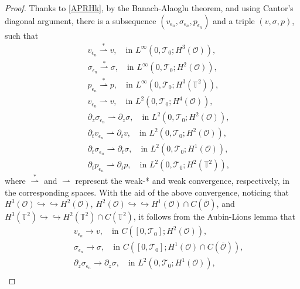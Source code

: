\documentclass[12pt,reqno]{amsart}
\numberwithin{equation}{section}
\begin{document}
\begin{proof}
  Thanks to \eqref{APRHk}, by the Banach-Alaoglu theorem, and using Cantor's diagonal argument,
  there is a subsequence $(v_{\epsilon_n}, \sigma_{\epsilon_n}, p_{\epsilon_n})$ and a triple $(v,\sigma,p)$,
  such that
  \begin{eqnarray}
    &&v_{\epsilon_n}\stackrel{\ast}{\rightharpoonup}v,\quad\mbox{in }L^\infty(0,\mathcal T_0; H^3(\mathcal O)),\label{WeaC1}\\
    &&\sigma_{\epsilon_n}\stackrel{\ast}{\rightharpoonup}\sigma,\quad\mbox{in }L^\infty(0,\mathcal T_0; H^2(\mathcal O)),\label{WeaC2}\\
    &&p_{\epsilon_n}\stackrel{\ast}{\rightharpoonup}p,\quad\mbox{in }L^\infty(0,\mathcal T_0; H^3(\mathbb T^2)),\label{WeaC3}\\
    &&v_{\epsilon_n}{\rightharpoonup}v,\quad\mbox{in }L^2(0,\mathcal T_0; H^4(\mathcal O)),\label{WeaC4}\\
    &&\partial_z\sigma_{\epsilon_n} {\rightharpoonup}\partial_z\sigma,\quad\mbox{in }L^2(0,\mathcal T_0; H^2(\mathcal O)),\label{WeaC5}\\
    &&\partial_tv_{\epsilon_n} {\rightharpoonup}\partial_tv,\quad\mbox{in }L^2(0,\mathcal T_0; H^2(\mathcal O)),\label{WeaC6}\\
    &&\partial_t\sigma_{\epsilon_n} {\rightharpoonup}\partial_t\sigma,\quad\mbox{in }L^2(0,\mathcal T_0; H^1(\mathcal O)),\label{WeaC7}\\
    &&\partial_tp_{\epsilon_n} {\rightharpoonup}\partial_tp,\quad\mbox{in }L^2(0,\mathcal T_0; H^2(\mathbb T^2)),\label{WeaC8}
  \end{eqnarray}
  where $\stackrel{\ast}{\rightharpoonup}$ and $\rightharpoonup$ represent the weak-* and weak convergence, respectively, in the corresponding spaces. With the aid of the above convergence, noticing that $H^3(\mathcal O)\hookrightarrow\hookrightarrow H^2(\mathcal O)$, $H^2(\mathcal O)\hookrightarrow\hookrightarrow H^1(\mathcal O)\cap C(\overline{\mathcal O})$, and $H^3(\mathbb T^2)\hookrightarrow\hookrightarrow H^2(\mathbb T^2)\cap C(\mathbb T^2)$,
  it follows from the Aubin-Lions lemma that
    \begin{eqnarray}
    &&v_{\epsilon_n} \rightarrow v,\quad\mbox{in }C([0,\mathcal T_0]; H^2(\mathcal O)),\label{StrC1}\\
    &&\sigma_{\epsilon_n} \rightarrow\sigma,\quad\mbox{in }C([0,\mathcal T_0]; H^1(\mathcal O)\cap C(\overline{\mathcal O})),\label{StrC2}\\
    &&\partial_z\sigma_{\epsilon_n} \rightarrow\partial_z\sigma,\quad\mbox{in }L^2(0,\mathcal T_0; H^1(\mathcal O)),\\

\end{eqnarray}
\end{proof}
\end{document}
